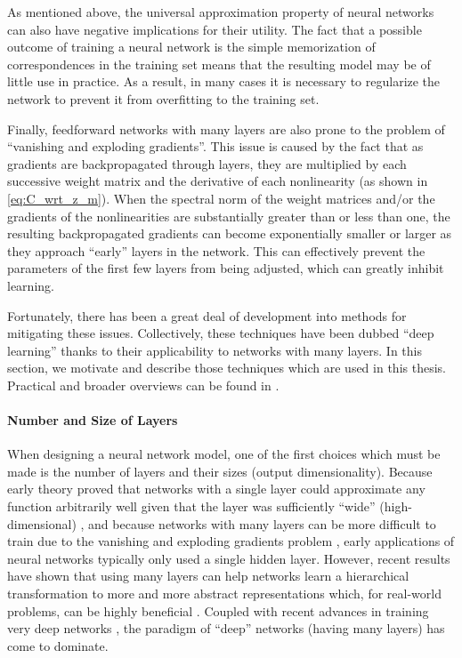 As mentioned above, the universal approximation property of neural networks can also have negative implications for their utility.
The fact that a possible outcome of training a neural network is the simple memorization of correspondences in the training set means that the resulting model may be of little use in practice.
As a result, in many cases it is necessary to regularize the network to prevent it from overfitting to the training set.

Finally, feedforward networks with many layers are also prone to the problem of ``vanishing and exploding gradients''.
This issue is caused by the fact that as gradients are backpropagated through layers, they are multiplied by each successive weight matrix and the derivative of each nonlinearity (as shown in \cref{eq:C_wrt_z_m}).
When the spectral norm of the weight matrices and/or the gradients of the nonlinearities are substantially greater than or less than one, the resulting backpropagated gradients can become exponentially smaller or larger as they approach ``early'' layers in the network.
This can effectively prevent the parameters of the first few layers from being adjusted, which can greatly inhibit learning.

Fortunately, there has been a great deal of development into methods for mitigating these issues.
Collectively, these techniques have been dubbed ``deep learning'' thanks to their applicability to networks with many layers.
In this section, we motivate and describe those techniques which are used in this thesis.
Practical and broader overviews can be found in \cite{bengio} \cite{lecun} \cite{nature}.

\paragraph{Number and Size of Layers}

When designing a neural network model, one of the first choices which must be made is the number of layers and their sizes (output dimensionality).
Because early theory proved that networks with a single layer could approximate any function arbitrarily well given that the layer was sufficiently ``wide'' (high-dimensional) \cite{}, and because networks with many layers can be more difficult to train due to the vanishing and exploding gradients problem \cite{}, early applications of neural networks typically only used a single hidden layer.
However, recent results have shown that using many layers can help networks learn a hierarchical transformation to more and more abstract representations which, for real-world problems, can be highly beneficial \cite{}.
Coupled with recent advances in training very deep networks \cite{}, the paradigm of ``deep'' networks (having many layers) has come to dominate.

